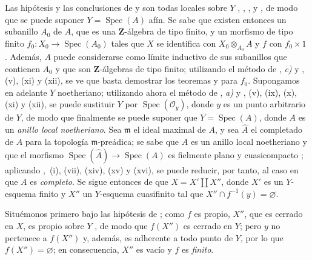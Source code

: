 \begin{env}[8.11.4]
\label{IV.8.11.4-fr}
Las hipótesis y las conclusiones de  y  son todas locales sobre $Y$ , , ,  y , de modo que se puede suponer $Y=\operatorname{Spec}(A)$ afín.
Se sabe que existen entonces un subanillo $A_0$ de $A$, que es una $\mathbf Z$-álgebra de tipo finito, y un morfismo de tipo finito $f_0:X_0\to\operatorname{Spec}(A_0)$ tales que $X$ se identifica con $X_0\otimes_{A_0}A$ y $f$ con $f_0\times1$ .
Además, $A$ puede considerarse como límite inductivo de sus subanillos que contienen $A_0$ y que son $\mathbf Z$-álgebras de tipo finito; utilizando el método de , \emph{c)} y , (v), (xi) y (xii), se ve que basta demostrar los teoremas  y  para $f_0$.
Supongamos en adelante $Y$ noetheriano; utilizando ahora el método de , \emph{a)} y , (v), (ix), (x), (xi) y (xii), se puede sustituir $Y$ por $\operatorname{Spec}(\mathcal O_y)$, donde $y$ es un
punto arbitrario de $Y$, de modo que finalmente se puede suponer que $Y=\operatorname{Spec}(A)$, donde $A$ es un \emph{anillo local noetheriano}.
Sea $\mathfrak m$ el ideal maximal de $A$, y sea $\widehat A$ el completado de $A$ para la topología $\mathfrak m$-preádica; se sabe que $\widehat A$ es un anillo local noetheriano y que el morfismo $\operatorname{Spec}(\widehat A)\to\operatorname{Spec}(A)$ es fielmente plano y cuasicompacto ; aplicando ,~(i), (vii), (xiv), (xv) y (xvi), se puede reducir, por tanto, al caso en que $A$ es \emph{completo}.
Se sigue entonces de  que $X=X'\amalg X''$, donde $X'$ es un $Y$-esquema finito y $X''$ un $Y$-esquema cuasifinito tal que $X''\cap f^{-1}(y)=\varnothing$.
\end{env}

Situémonos primero bajo las hipótesis de ; como $f$ es propio, $X''$, que es cerrado en $X$, es propio sobre $Y$ , de modo que $f(X'')$ es cerrado en $Y$; pero $y$ no pertenece a $f(X'')$ y, además, es adherente a todo punto de $Y$, por lo que $f(X'')=\varnothing$; en consecuencia, $X''$ es vacío y $f$ es \emph{finito}.

